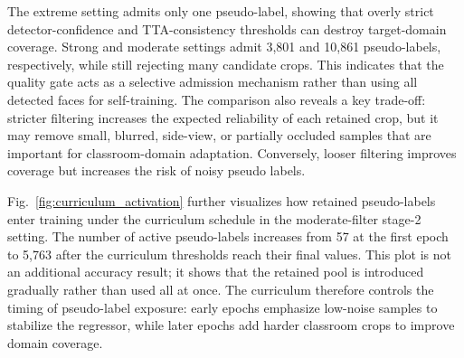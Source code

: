 \documentclass[preprint,12pt]{elsarticle}
\begin{document}
\begin{table}[h]
\centering
\caption{Pseudo-label admission statistics under different quality-filtering settings. ``Detected faces'' denotes the retained candidate detections after detector-confidence filtering. The admission ratio is computed with respect to these retained candidate detections. The extreme setting is a diagnostic boundary case rather than a practical training configuration.}
\label{tab:pseudo_label_admission_stats}
\scriptsize
{}
\end{table}

The extreme setting admits only one pseudo-label, showing that overly strict detector-confidence and TTA-consistency thresholds can destroy target-domain coverage. Strong and moderate settings admit 3,801 and 10,861 pseudo-labels, respectively, while still rejecting many candidate crops. This indicates that the quality gate acts as a selective admission mechanism rather than using all detected faces for self-training. The comparison also reveals a key trade-off: stricter filtering increases the expected reliability of each retained crop, but it may remove small, blurred, side-view, or partially occluded samples that are important for classroom-domain adaptation. Conversely, looser filtering improves coverage but increases the risk of noisy pseudo labels.

Fig.~\ref{fig:curriculum_activation} further visualizes how retained pseudo-labels enter training under the curriculum schedule in the moderate-filter stage-2 setting. The number of active pseudo-labels increases from 57 at the first epoch to 5,763 after the curriculum thresholds reach their final values. This plot is not an additional accuracy result; it shows that the retained pool is introduced gradually rather than used all at once. The curriculum therefore controls the timing of pseudo-label exposure: early epochs emphasize low-noise samples to stabilize the regressor, while later epochs add harder classroom crops to improve domain coverage.
\end{document}
